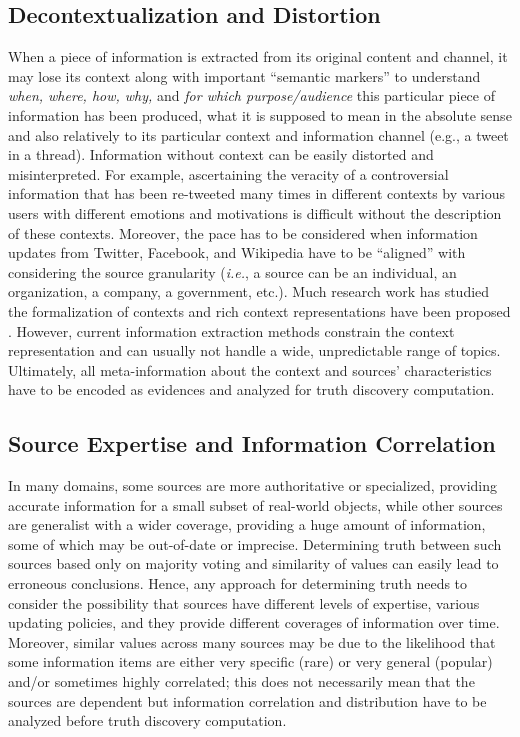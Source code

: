 \documentclass[prodmode,acmtecs]{acmsmall} %
\begin{document}
\subsection{Decontextualization and Distortion}  


When a piece of information  is 
extracted from its original content and channel, it may lose its context along with important 
``semantic markers'' to understand {\it when, where, how, why,} and {\it for which purpose/audience} this particular piece of information 
has been produced, what it is supposed to mean in the absolute sense and also relatively to 
its particular context and  information channel (e.g., a tweet in a thread).  Information without context can be easily 
distorted and misinterpreted. For example, ascertaining the veracity of a controversial
 information that has been re-tweeted many times in different contexts by various users with different emotions and motivations is difficult without
 the description of these contexts. Moreover, the pace has to be considered when information  updates from Twitter, Facebook, and Wikipedia have to be ``aligned'' with considering the source granularity ({\it i.e.}, a source can be an individual, an organization, a company, a government, etc.). Much research work has studied the formalization of contexts 
 and rich context representations have been proposed \cite{eps270829}. However, current information extraction 
 methods constrain the context representation and can usually not handle a wide, unpredictable 
 range of topics. %
 Ultimately, all meta-information about the context and sources' characteristics have to be encoded as evidences and analyzed for truth discovery computation.

\subsection{Source Expertise and Information Correlation} 

In many domains, some sources are more authoritative or specialized, providing
accurate information for a small subset of real-world objects, while other
sources are generalist with a wider coverage, providing a huge amount of information,
some of which may be out-of-date or imprecise. 
Determining truth between such sources based only on majority voting and similarity of values can easily lead to erroneous conclusions.
Hence, any approach for determining truth needs to
consider the possibility that sources have different levels of expertise, various updating policies, and they
provide different coverages of information over time. Moreover, similar values across many sources may be due to the likelihood that some information items are either very specific (rare) or very general (popular) and/or sometimes highly correlated; this does not necessarily mean that the sources are dependent but information correlation and distribution have to be analyzed before truth discovery computation.
\end{document}
